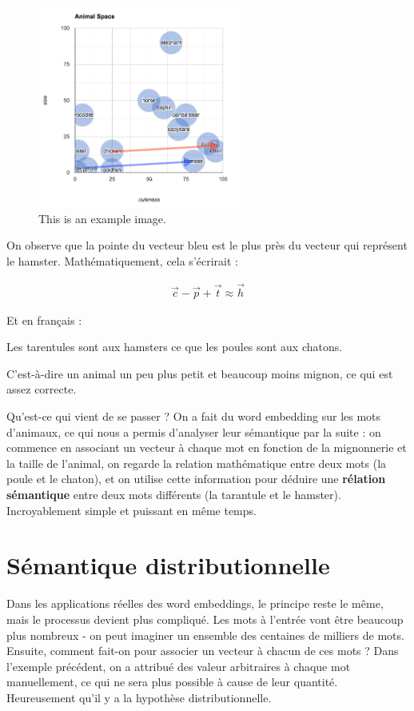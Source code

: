 \documentclass[11pt, a4paper]{report}
\begin{document}
\begin{figure}[h]
  \centering
  \includegraphics[width=0.6\textwidth]{animal-space-dif.png}
  \caption{This is an example image.}
  \label{fig:example}
\end{figure}

On observe que la pointe du vecteur bleu est le plus près du vecteur qui représent le hamster.
Mathématiquement, cela s'écrirait :

\begin{align*}
  \vec{c} - \vec{p} + \vec{t} \approx \vec{h} 
\end{align*}

Et en français : 

\begin{center}
  Les tarentules sont aux hamsters ce que les poules sont aux chatons. 
\end{center}

C'est-à-dire un animal un peu plus petit et beaucoup moins mignon, ce qui est assez 
correcte. 

Qu'est-ce qui vient de se passer ? On a fait du word embedding sur les 
mots d'animaux, ce qui nous a permis d'analyser leur sémantique par la suite : 
on commence en associant un vecteur à chaque mot en fonction de la mignonnerie et la 
taille de l'animal, on regarde la relation mathématique entre deux mots
(la poule et le chaton), et on utilise cette information pour déduire une \textbf{rélation sémantique} entre deux mots différents
(la tarantule et le hamster). Incroyablement simple et puissant en même temps.

\section{Sémantique distributionnelle}
Dans les applications réelles des word embeddings, le principe reste le même, mais le processus devient plus 
compliqué. Les mots à l'entrée vont être beaucoup plus nombreux - on peut imaginer un ensemble 
des centaines de milliers de mots. Ensuite, comment fait-on pour associer un vecteur à chacun
de ces mots ? Dans l'exemple précédent, on a attribué des valeur arbitraires à chaque mot 
manuellement, ce qui ne sera plus possible à cause de leur quantité. Heureusement qu'il y a la 
hypothèse distributionnelle. 
\end{document}
